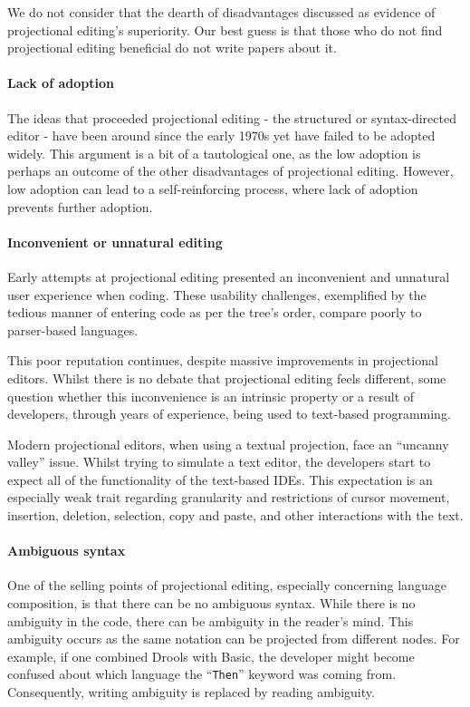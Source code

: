 We do not consider that the dearth of disadvantages discussed as evidence of projectional editing's superiority.
Our best guess is that those who do not find projectional editing beneficial do not write papers about it.

\paragraph{Lack of adoption} The ideas that proceeded projectional editing - the structured or syntax-directed editor - have been around since the early 1970s yet have failed to be adopted widely.
This argument is a bit of a tautological one, as the low adoption is perhaps an outcome of the other disadvantages of projectional editing.
However, low adoption can lead to a self-reinforcing process, where lack of adoption prevents further adoption.

\paragraph{Inconvenient or unnatural editing} Early attempts at projectional editing presented an inconvenient and unnatural user experience when coding.
These usability challenges, exemplified by the tedious manner of entering code as per the tree's order, compare poorly to parser-based languages.

This poor reputation continues, despite massive improvements in projectional editors.
Whilst there is no debate that projectional editing feels different, some question whether this inconvenience is an intrinsic property or a result of developers, through years of experience, being used to text-based programming.

Modern projectional editors, when using a textual projection, face an ``uncanny valley'' issue.
Whilst trying to simulate a text editor, the developers start to expect all of the functionality of the text-based IDEs.
This expectation is an especially weak trait regarding granularity and restrictions of cursor movement, insertion, deletion, selection, copy and paste, and other interactions with the text.

\paragraph{Ambiguous syntax} One of the selling points of projectional editing, especially concerning language composition, is that there can be no ambiguous syntax.
While there is no ambiguity in the code, there can be ambiguity in the reader's mind.
This ambiguity occurs as the same notation can be projected from different nodes.
For example, if one combined Drools with Basic, the developer might become confused about which language the ``\texttt{Then}'' keyword was coming from.
Consequently, writing ambiguity is replaced by reading ambiguity.

